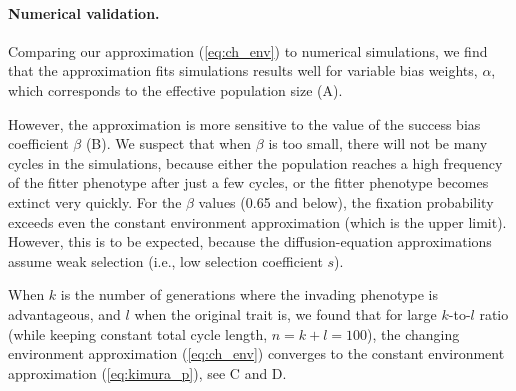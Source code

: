 \documentclass[12pt]{extarticle}
\begin{document}
\paragraph{Numerical validation.}
Comparing our approximation (\cref{eq:ch_env}) to numerical simulations, we find that the approximation fits simulations results well for variable bias weights, $\alpha$, which corresponds to the effective population size (A).

However, the approximation is more sensitive to the value of the success bias coefficient $\beta$ (B).
We suspect that when $\beta$ is too small, there will not be many cycles in the simulations, because either the population reaches a high frequency of the fitter phenotype after just a few cycles, or the fitter phenotype becomes extinct very quickly. 
For the $\beta$ values (0.65 and below), the fixation probability exceeds even the constant environment approximation (which is the upper limit). However, this is to be expected, because the diffusion-equation approximations assume weak selection (i.e., low selection coefficient $s$).


When $k$ is the number of generations where the invading phenotype is advantageous, and $l$ when the original trait is, we found that for large $k$-to-$l$ ratio (while keeping constant total cycle length, $n=k+l=100$), the changing environment approximation (\cref{eq:ch_env}) converges to the constant environment approximation (\cref{eq:kimura_p}), see C and D.
\end{document}
